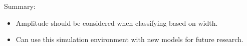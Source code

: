 \documentclass{beamer}
\begin{document}
\begin{frame}{}
    Summary:
    \begin{itemize}
        \item Amplitude should be considered when classifying based on width.
        \item Can use this simulation environment with new models for future 
            research.
    \end{itemize}
\end{frame}
\end{document}
